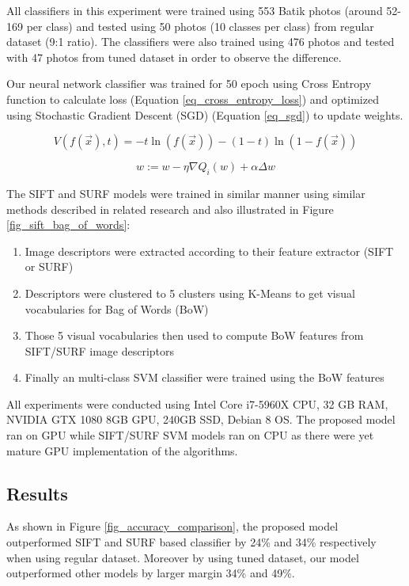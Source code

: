\documentclass[conference]{IEEEtran}
\begin{document}
All classifiers in this experiment were trained using 553 Batik photos (around 52-169 per class) and tested using 50 photos (10 classes per class) from regular dataset (9:1 ratio). The classifiers were also trained using 476 photos and tested with 47 photos from tuned dataset in order to observe the difference.

Our neural network classifier was trained for 50 epoch using Cross Entropy function to calculate loss (Equation \ref{eq_cross_entropy_loss}) and optimized using Stochastic Gradient Descent (SGD) (Equation \ref{eq_sgd}) to update weights.

\begin{equation}
V(f(\vec{x}),t) = -t\ln(f(\vec{x}))-(1-t)\ln(1-f(\vec{x}))
\label{eq_cross_entropy_loss}
\end{equation}

\begin{equation}
w:=w-\eta \nabla Q_{i}(w)+\alpha \Delta w
\label{eq_sgd}
\end{equation}

The SIFT and SURF models were trained in similar manner using similar methods described in related research \cite{azhar2015batik} and also illustrated in Figure \ref{fig_sift_bag_of_words}:
\begin{enumerate}
\item Image descriptors were extracted according to their feature extractor (SIFT or SURF)
\item Descriptors were clustered to 5 clusters using K-Means to get visual vocabularies for Bag of Words (BoW)
\item Those 5 visual vocabularies then used to compute BoW features from SIFT/SURF image descriptors
\item Finally an multi-class SVM classifier were trained using the BoW features
\end{enumerate}

All experiments were conducted using Intel Core i7-5960X CPU, 32 GB RAM, NVIDIA GTX 1080 8GB GPU, 240GB SSD, Debian 8 OS. The proposed model ran on GPU while SIFT/SURF SVM models ran on CPU as there were yet mature GPU implementation of the algorithms.

\subsection{Results}

As shown in Figure \ref{fig_accuracy_comparison}, the proposed model outperformed SIFT and SURF based classifier by 24\% and 34\% respectively when using regular dataset. Moreover by using tuned dataset, our model outperformed other models by larger margin 34\% and 49\%.
\end{document}
